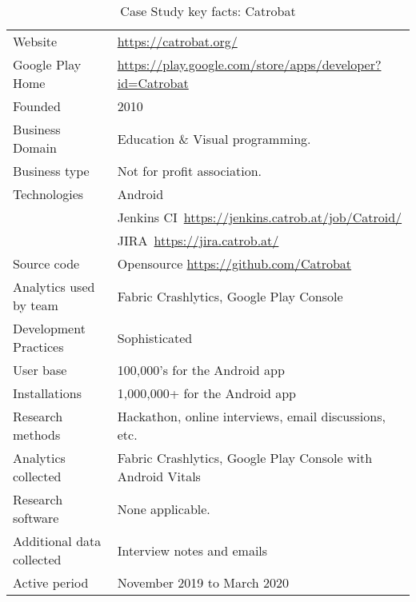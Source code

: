 {\renewcommand{\arraystretch}{0.8}%
\begin{table*}
    \centering
    \small
    \setlength{\tabcolsep}{6pt}
    \begin{tabular}{lp{11cm}}
       \toprule
       Website &\url{https://catrobat.org/} \\
       Google Play Home & \url{https://play.google.com/store/apps/developer?id=Catrobat} \\
       Founded & 2010 \\
       Business Domain & Education \& Visual programming. \\
       Business type & Not for profit association. \\
       Technologies  & Android \\
       & Jenkins CI~\url{https://jenkins.catrob.at/job/Catroid/}  \\
       & JIRA~\url{https://jira.catrob.at/} \\
       Source code  & Opensource \url{https://github.com/Catrobat} \\
       Analytics used by team & Fabric Crashlytics, Google Play Console \\
       Development Practices & Sophisticated~\footnotemark \\
       \midrule
       User base & 100,000's for the Android app \\
       Installations & 1,000,000+ for the Android app \\
       \midrule
       Research methods &Hackathon, online interviews, email discussions, etc. \\
       Analytics collected &Fabric Crashlytics, Google Play Console with Android Vitals \\
       Research software & None applicable. \\
       Additional data collected &Interview notes and emails \\
       Active period & November 2019 to March 2020 \\
       \bottomrule
    \end{tabular}
    \caption{Case Study key facts: Catrobat}
    \label{tab:blank_case_study_anaytics_overview}
\end{table*}
}


